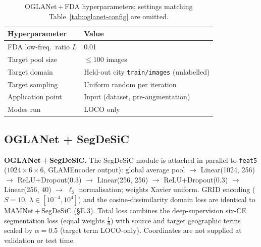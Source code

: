 \begin{table}[h]
\centering
\caption{OGLANet\,+\,FDA hyperparameters; settings matching
Table~\ref{tab:oglanet-config} are omitted.}
\label{tab:oglanet-fda}
\small
\begin{tabular}{@{}ll@{}}
\toprule
\textbf{Hyperparameter} & \textbf{Value} \\
\midrule
FDA low-freq.\ ratio $L$ & 0.01 \\
Target pool size         & $\leq 100$ images \\
Target domain            & Held-out city \texttt{train/images} (unlabelled) \\
Target sampling          & Uniform random per iteration \\
Application point        & Input (dataset, pre-augmentation) \\
Modes run                & LOCO only \\
\bottomrule
\end{tabular}
\end{table}

\subsection{OGLANet + SegDeSiC}

\textbf{OGLANet\,+\,SegDeSiC.}
The SegDeSiC module is attached in parallel to \texttt{feat5}
($1024{\times}6{\times}6$, GLAMEncoder output): global average pool
$\to$ Linear(1024, 256) $\to$ ReLU+Dropout(0.3)
$\to$ Linear(256, 256) $\to$ ReLU+Dropout(0.3)
$\to$ Linear(256, 40) $\to$ $\ell_2$ normalisation; weights Xavier
uniform.  GRID encoding ($S{=}10$, $\lambda{\in}[10^{-4},10^{4}]$) and
the cosine-dissimilarity domain loss are identical to
MAMNet\,+\,SegDeSiC (\S E.3).  Total loss combines the deep-supervision
six-CE segmentation loss (equal weights $\tfrac{1}{6}$) with source and
target geographic terms scaled by $\alpha{=}0.5$ (target term
LOCO-only).  Coordinates are not supplied at validation or test time.


